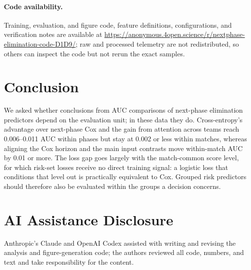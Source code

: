 \documentclass[sigconf,anonymous]{acmart}
\newcommand{\artifacturl}{\url{https://anonymous.4open.science/r/nextphase-elimination-code-D1D9/}}
\begin{document}
\paragraph{Code availability.}
Training, evaluation, and figure code, feature definitions, configurations, and verification notes are available at \artifacturl{}; raw and processed telemetry are not redistributed, so others can inspect the code but not rerun the exact samples.

\section{Conclusion}
\label{sec:conclusion}
We asked whether conclusions from AUC comparisons of next-phase elimination predictors depend on the evaluation unit; in these data they do. Cross-entropy's advantage over next-phase Cox and the gain from attention across teams reach 0.006--0.011 AUC within phases but stay at 0.002 or less within matches, whereas aligning the Cox horizon and the main input contrasts move within-match AUC by 0.01 or more. The loss gap goes largely with the match-common score level, for which risk-set losses receive no direct training signal: a logistic loss that conditions that level out is practically equivalent to Cox. Grouped risk predictors should therefore also be evaluated within the groups a decision concerns.

\section*{AI Assistance Disclosure}
Anthropic's Claude and OpenAI Codex assisted with writing and revising the analysis and figure-generation code; the authors reviewed all code, numbers, and text and take responsibility for the content.



\end{document}
